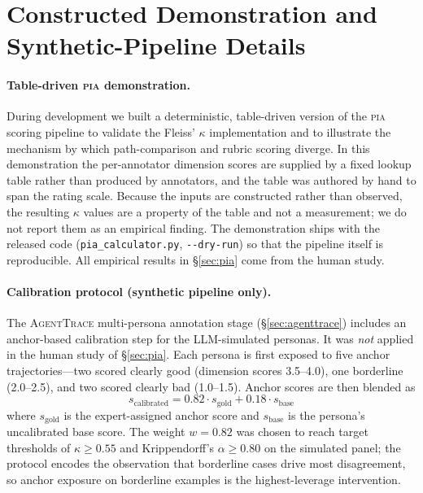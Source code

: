 \documentclass{article}
\newcommand{\PIA}{\textsc{pia}}          %
\newcommand{\AgentTrace}{\textsc{AgentTrace}}
\begin{document}
\appendix

\section{Constructed Demonstration and Synthetic-Pipeline Details}
\label{app:demo}

\paragraph{Table-driven \PIA{} demonstration.}
During development we built a deterministic, table-driven version of the
\PIA{} scoring pipeline to validate the Fleiss' $\kappa$ implementation and
to illustrate the mechanism by which path-comparison and rubric scoring
diverge. In this demonstration the per-annotator dimension scores are
supplied by a fixed lookup table rather than produced by annotators, and the
table was authored by hand to span the rating scale. Because the inputs are
constructed rather than observed, the resulting $\kappa$ values are a
property of the table and not a measurement; we do not report them as an
empirical finding. The demonstration ships with the released code
(\texttt{pia\_calculator.py}, \texttt{-{}-dry-run}) so that the pipeline
itself is reproducible. All empirical results in \S\ref{sec:pia} come from
the human study.

\paragraph{Calibration protocol (synthetic pipeline only).}
The \AgentTrace{} multi-persona annotation stage (\S\ref{sec:agenttrace})
includes an anchor-based calibration step for the LLM-simulated personas. It
was \emph{not} applied in the human study of \S\ref{sec:pia}. Each persona is
first exposed to five anchor trajectories---two scored clearly good
(dimension scores 3.5--4.0), one borderline (2.0--2.5), and two scored
clearly bad (1.0--1.5). Anchor scores are then blended as
\begin{equation}
  s_{\text{calibrated}} = 0.82 \cdot s_{\text{gold}} + 0.18 \cdot s_{\text{base}}
  \label{eq:calibration}
\end{equation}
where $s_{\text{gold}}$ is the expert-assigned anchor score and
$s_{\text{base}}$ is the persona's uncalibrated base score. The weight
$w = 0.82$ was chosen to reach target thresholds of $\kappa \geq 0.55$ and
Krippendorff's $\alpha \geq 0.80$ on the simulated panel; the protocol
encodes the observation that borderline cases drive most disagreement, so
anchor exposure on borderline examples is the highest-leverage intervention.
\end{document}
